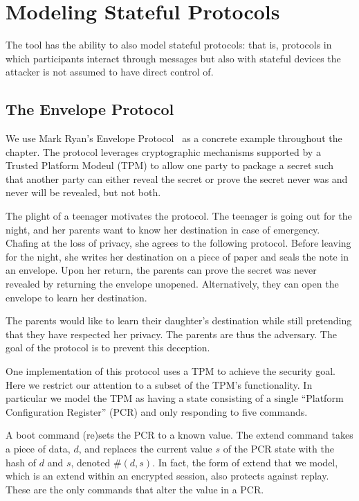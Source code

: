 \chapter{Modeling Stateful Protocols}
\label{ch:state}

The {\cpsa} tool has the ability to also model stateful protocols:
that is, protocols in which participants interact through messages but
also with stateful devices the attacker is not assumed to have direct
control of.

\section{The Envelope Protocol}
\label{sec:envelope}

We use Mark Ryan's Envelope Protocol~\cite{ArapinisEtAl2011} as a
concrete example throughout the chapter. The protocol leverages
cryptographic mechanisms supported by a Trusted Platform Modeul (TPM)
to allow one party to package a secret such that another party can
either reveal the secret or prove the secret never was and never will
be revealed, but not both.

The plight of a teenager motivates the protocol.  The teenager is
going out for the night, and her parents want to know her destination
in case of emergency.  Chafing at the loss of privacy, she agrees to
the following protocol.  Before leaving for the night, she writes her
destination on a piece of paper and seals the note in an envelope.
Upon her return, the parents can prove the secret was never revealed
by returning the envelope unopened. Alternatively, they can open the
envelope to learn her destination.

The parents would like to learn their daughter's destination while
still pretending that they have respected her privacy. The parents are
thus the adversary.  The goal of the protocol is to prevent this
deception.

One implementation of this protocol uses a TPM to achieve the security
goal.  Here we restrict our attention to a subset of the TPM's
functionality. In particular we model the TPM as having a state
consisting of a single ``Platform Configuration Register'' (PCR) and
only responding to five commands.

A \textsf{boot} command (re)sets the PCR to a known value.  The
\textsf{extend} command takes a piece of data, $d$, and replaces the
current value $s$ of the PCR state with the hash of $d$ and
$s$, denoted $\#(d,s)$.  In fact, the form of
\textsf{extend} that we model, which is an \textsf{extend} within an
encrypted session, also protects against replay.  These are the only
commands that alter the value in a PCR.


